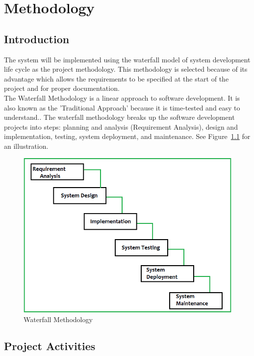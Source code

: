 \documentclass[twoside, a4paper, 12pt]{report}
\begin{document}
\chapter{Methodology}
\section{Introduction}
The system will be implemented using the waterfall model of system development life cycle as the project methodology. This methodology is selected because of its advantage which allows the requirements to be specified at the start of the project and for proper documentation.\\
\indent
The Waterfall Methodology is a linear approach to software development. It is also known as the 'Traditional Approach' because it is time-tested and easy to understand.\autocite{adenowo2013software}. The waterfall methodology breaks up the software development projects into steps: planning and analysis (Requirement Analysis), design and implementation, testing, system deployment, and maintenance. See Figure~\ref{fig:waterfall-methodology} for an illustration.

\begin{figure} [ht]
	\centering
	\includegraphics[width=1\textwidth]{waterfallmodelimg}
	\caption{Waterfall Methodology}
	\label{fig:waterfall-methodology}
\end{figure}

\section{Project Activities}
\end{document}
